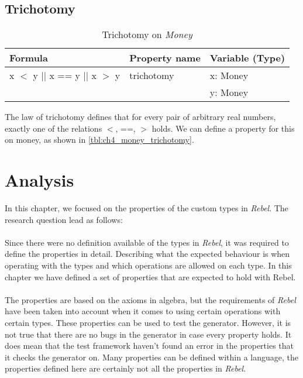 \subsection*{Trichotomy}
\FloatBarrier
\begin{table}[!ht]
\centering
\begin{tabular}{lll}
\hline
                        \textbf{Formula}             & \textbf{Property name} & \textbf{Variable (Type)} \\ \hline
\rowcolor[HTML]{EFEFEF} x $<$ y $||$ x == y $||$ x $>$ y & trichotomy             & x: Money                 \\
\rowcolor[HTML]{EFEFEF}                              &                        & y: Money                 \\ \hline
\end{tabular}
\caption{Trichotomy on \textit{Money}}
\label{tbl:ch4_money_trichotomy}
\end{table}
\FloatBarrier
The law of trichotomy defines that for every pair of arbitrary real numbers, exactly one of the relations $<$, ==, $>$ holds. We can define a property for this on money, as shown in \autoref{tbl:ch4_money_trichotomy}.

\section{Analysis}
In this chapter, we focused on the properties of the custom types in \textit{Rebel}. The research question lead as follows:\rqOne\\
\\
Since there were no definition available of the types in \textit{Rebel}, it was required to define the properties in detail. Describing what the expected behaviour is when operating with the types and which operations are allowed on each type. In this chapter we have defined a set of properties that are expected to hold with Rebel.\\
\\
The properties are based on the axioms in algebra, but the requirements of \textit{Rebel} have been taken into account when it comes to using certain operations with certain types. These properties can be used to test the generator. However, it is not true that there are no bugs in the generator in case every property holds. It does mean that the test framework haven't found an error in the properties that it checks the generator on. Many properties can be defined within a language, the properties defined here are certainly not all the properties in \textit{Rebel}.

